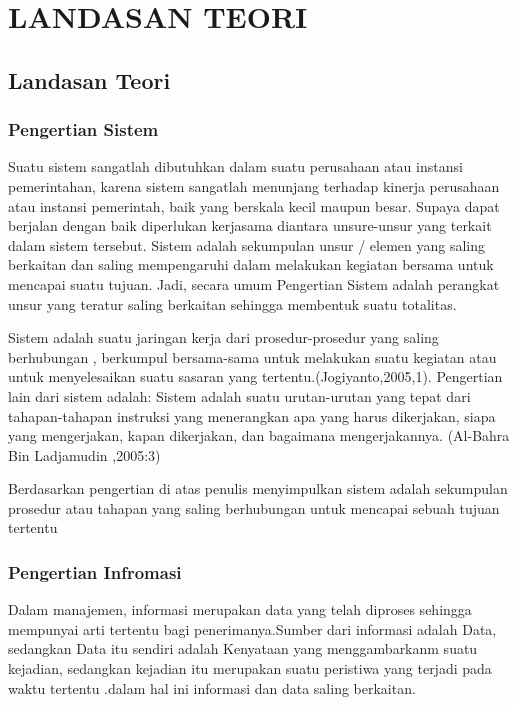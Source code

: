 \documentclass{jtetiproposalskripsi}
\begin{document}
\chapter{LANDASAN TEORI}          
\section{Landasan Teori}      
\subsection{Pengertian Sistem}
Suatu sistem sangatlah dibutuhkan dalam suatu perusahaan atau instansi pemerintahan, karena sistem sangatlah menunjang terhadap kinerja perusahaan atau instansi pemerintah, baik yang berskala kecil maupun besar. Supaya dapat berjalan dengan baik diperlukan kerjasama diantara unsure-unsur yang terkait dalam sistem tersebut. Sistem adalah sekumpulan unsur / elemen yang saling berkaitan dan saling mempengaruhi dalam melakukan kegiatan bersama untuk mencapai suatu tujuan. Jadi, secara umum Pengertian Sistem adalah perangkat unsur yang teratur saling berkaitan sehingga membentuk suatu totalitas.

Sistem adalah suatu jaringan kerja dari prosedur-prosedur yang saling berhubungan , berkumpul bersama-sama untuk melakukan suatu kegiatan atau untuk menyelesaikan suatu sasaran yang tertentu.(Jogiyanto,2005,1).  Pengertian lain dari sistem adalah:  Sistem adalah suatu urutan-urutan yang tepat dari  tahapan-tahapan instruksi yang menerangkan apa yang harus dikerjakan, siapa yang mengerjakan, kapan  dikerjakan, dan bagaimana mengerjakannya. (Al-Bahra Bin Ladjamudin ,2005:3)

Berdasarkan pengertian di atas penulis menyimpulkan sistem adalah sekumpulan prosedur atau tahapan yang saling  berhubungan untuk mencapai sebuah tujuan tertentu

\subsection{Pengertian Infromasi}
Dalam manajemen, informasi merupakan data yang telah diproses sehingga mempunyai arti tertentu bagi penerimanya.Sumber dari informasi adalah Data, sedangkan Data itu sendiri adalah Kenyataan yang menggambarkanm suatu kejadian, sedangkan kejadian itu merupakan suatu peristiwa yang terjadi pada waktu tertentu .dalam hal ini informasi dan data saling berkaitan.
\end{document}

